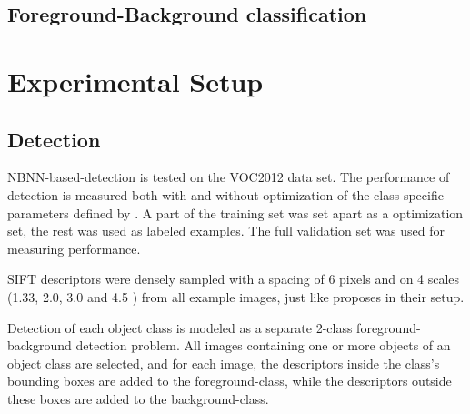 \documentclass[a4paper,10pt]{article}
\begin{document}


\subsection{Foreground-Background classification} %
\label{sec:foreground_background_classification}


\section{Experimental Setup} %
\label{sec:experimental_setup}



\subsection{Detection} %
\label{sub:detection}
NBNN-based-detection is tested on the VOC2012  data set. The performance of detection is measured both with and without optimization of the class-\-specific pa\-ra\-me\-ters defined by \cite{behmo2010towards}. A part of the training set was set apart as a optimization set, the rest was used as labeled examples. The full validation set was used for measuring performance.

SIFT descriptors were densely sampled with a spacing of 6 pixels and on 4 scales (1.33, 2.0, 3.0 and 4.5 ) from all example images, just like \cite{mccann2012local} proposes in their setup. 


Detection of each object class is modeled as a separate 2-class foreground-background detection problem. All images containing one or more objects of an object class are selected, and for each image, the descriptors inside the class's bounding boxes are added to the foreground-class, while the descriptors outside these boxes are added to the background-class.
\end{document}

